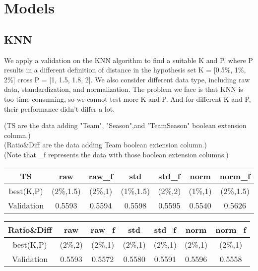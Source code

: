 \section{Models}
\subsection*{KNN}

\quad We apply a validation on the KNN algorithm to find a suitable K and P, where P results in a different definition of distance in the hypothesis set K = [0.5\%, 1\%, 2\%] cross P = [1, 1.5, 1.8, 2]. We also consider different data type, including raw data, standardization, and normalization. The problem we face is that KNN is too time-consuming, so we cannot test more K and P. And for different K and P, their performance didn't differ a lot.

\noindent
(TS are the data adding "Team", "Season",and "TeamSeason" boolean extension column.) \\
(Ratio\&Diff are the data adding Team boolean extension column.) \\
(Note that \_f represents the data with those boolean extension columns.)

\vspace{6pt}

\begin{tabular}{|c|c|c|c|c|c|c|}
    \hline
    TS & raw & raw\_f & std & std\_f & norm & norm\_f \\\hline
    best(K,P) & (2\%,1.5) & (2\%,1) & (1\%,1.5) & (2\%,2) & (1\%,1) & (2\%,1.5)\\\hline
    Validation & 0.5593 & 0.5594 & 0.5598 & 0.5595 & 0.5540 & 0.5626\\\hline
\end{tabular}

\vspace{12pt}

\begin{tabular}{|c|c|c|c|c|c|c|}
    \hline
    Ratio\&Diff & raw & raw\_f & std & std\_f & norm & norm\_f \\\hline
    best(K,P) & (2\%,2) & (2\%,1) & (2\%,1) & (2\%,1) & (2\%,1) & (2\%,1)\\\hline
    Validation & 0.5593 & 0.5572 & 0.5580 & 0.5591 & 0.5596 & 0.5558\\\hline
\end{tabular}